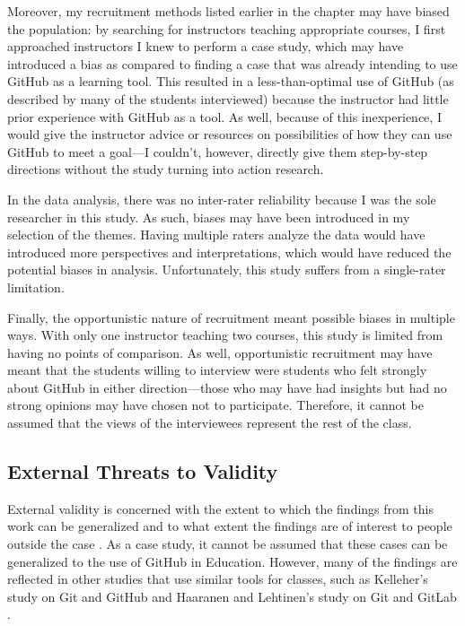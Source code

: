 Moreover, my recruitment methods listed earlier in the chapter may have biased the population: by searching for instructors teaching appropriate courses, I first approached instructors I knew to perform a case study, which may have introduced a bias as compared to finding a case that was already intending to use GitHub as a learning tool. This resulted in a less-than-optimal use of GitHub (as described by many of the students interviewed) because the instructor had little prior experience with GitHub as a tool. As well, because of this inexperience, I would give the instructor advice or resources on possibilities of how they can use GitHub to meet a goal---I couldn't, however, directly give them step-by-step directions without the study turning into action research.

In the data analysis, there was no inter-rater reliability because I was the sole researcher in this study. As such, biases may have been introduced in my selection of the themes. Having multiple raters analyze the data would have introduced more perspectives and interpretations, which would have reduced the potential biases in analysis. Unfortunately, this study suffers from a single-rater limitation.

Finally, the opportunistic nature of recruitment meant possible biases in multiple ways. With only one instructor teaching two courses, this study is limited from having no points of comparison. As well, opportunistic recruitment may have meant that the students willing to interview were students who felt strongly about GitHub in either direction---those who may have had insights but had no strong opinions may have chosen not to participate. Therefore, it cannot be assumed that the views of the interviewees represent the rest of the class.

\subsection{External Threats to Validity}
External validity is concerned with the extent to which the findings from this work can be generalized and to what extent the findings are of interest to people outside the case \cite{runeson2012case}. As a case study, it cannot be assumed that these cases can be generalized to the use of GitHub in Education. However, many of the findings are reflected in other studies that use similar tools for classes, such as Kelleher's study on Git and GitHub \cite{kelleher2014employing} and Haaranen and Lehtinen's study on Git and GitLab \cite{haaranen2015teaching}. %
